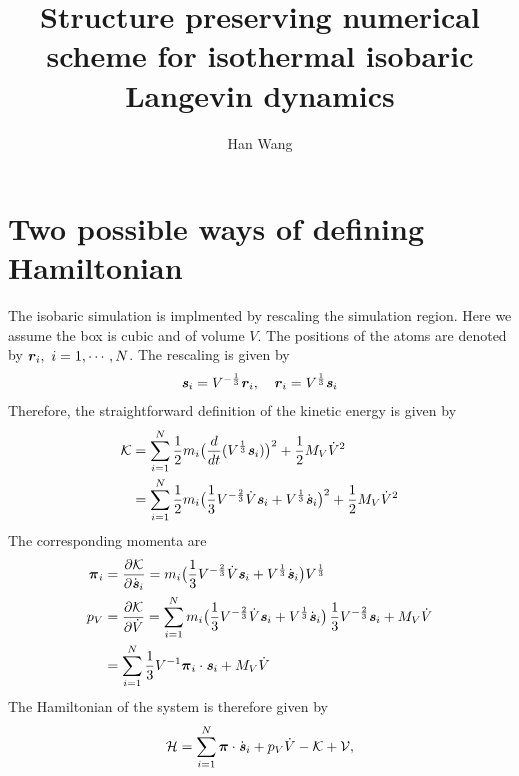 \documentclass[aps, pre, preprint,unsortedaddress,a4paper,onecolumn]{revtex4}
\newcommand{\vect}[1]{\textbf{\textit{#1}}}
\newcommand{\mypi}{\boldsymbol\pi}
\begin{document}
\title{Structure preserving numerical scheme for isothermal isobaric Langevin dynamics}
\author{Han Wang}
   
\begin{abstract}
\end{abstract}

\maketitle

\section{Two possible ways of defining Hamiltonian}

The isobaric simulation is implmented by rescaling the simulation region.
Here we assume the box is cubic and of volume $V$. The positions of the
atoms are denoted by $\vect r_i,\ i=1, \cdots, N$. 
The rescaling is given by
\begin{align}
  \vect s_i = V^{-\frac13} \vect r_i, \quad \vect r_i = V^{\frac13}\vect s_i
\end{align}
Therefore, the straightforward definition of the kinetic energy is given by
\begin{align}
  \mathcal K &=
  \sum_{i=1}^N \frac12 m_i \big(\frac{d}{dt} (V^{\frac13}\vect s_i) \big)^2
  +
  \frac 12 {M_V} \dot V^2 \\
  & =
  \sum_{i=1}^N \frac 12 m_i
  \big(\frac13 V^{-\frac23} \dot V \vect s_i + V^{\frac13}\dot{\vect s}_i\big)^2
  +
  \frac 12 {M_V} \dot V^2 
\end{align}
The corresponding momenta are
\begin{align}
  \mypi_i
  &=
  \frac{\partial \mathcal K}{\partial \dot{\vect s}_i} =
  m_i \big(\frac13 V^{-\frac23} \dot V \vect s_i + V^{\frac13}\dot{\vect s}_i\big) V^{\frac13}  \\
  p_V
  &=
  \frac{\partial \mathcal K}{\partial \dot{V}}
  =
  \sum_{i=1}^N m_i
  \big(\frac13 V^{-\frac23} \dot V \vect s_i + V^{\frac13}\dot{\vect s}_i\big)\,
  \frac13 V^{-\frac23}\vect s_i
  +
  {M_V}\dot V \\
  &=
  \sum_{i=1}^N 
  \frac13 V^{-1} \mypi_i\cdot\vect s_i + {M_V} \dot V
\end{align}
The Hamiltonian of the system is therefore given by
\begin{align}
  \mathcal H =
  \sum_{i=1}^N \mypi\cdot\dot{\vect s}_i + p_V \dot V - \mathcal K + \mathcal V,
\end{align}
\end{document}
